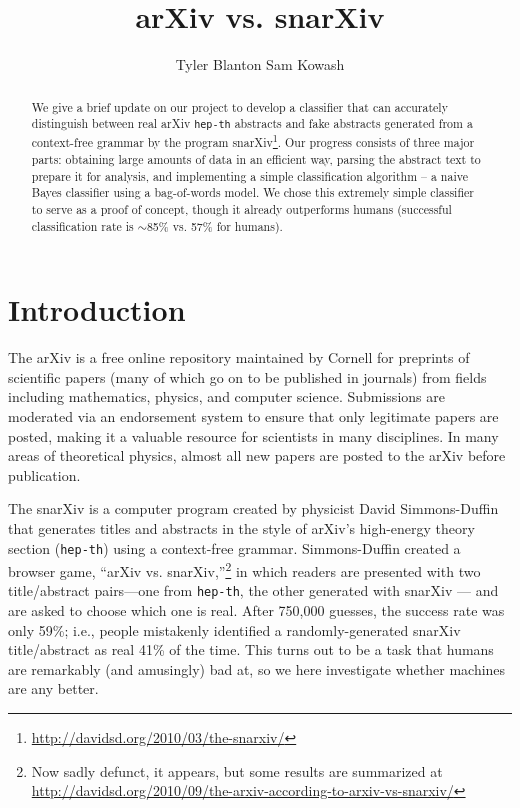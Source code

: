 \documentclass{article}
\title{arXiv vs. snarXiv}
\author{Tyler Blanton \And Sam Kowash}
\begin{document}

\maketitle

\begin{abstract}
  We give a brief update on our project to develop a classifier that can accurately distinguish between real arXiv \texttt{hep-th} abstracts and fake abstracts generated from a context-free grammar by the program snarXiv\footnote{\url{http://davidsd.org/2010/03/the-snarxiv/}}.
  Our progress consists of three major parts: obtaining large amounts of data in an efficient way, parsing the abstract text to prepare it for analysis, and implementing a simple classification algorithm -- a naive Bayes classifier using a bag-of-words model.
  We chose this extremely simple classifier to serve as a proof of concept, though it already outperforms humans (successful classification rate is $\sim$85\% vs. 57\% for humans).
\end{abstract}




\section{Introduction} \label{sec:intro}
The arXiv is a free online repository maintained by Cornell for preprints of scientific papers (many of which go on to be published in journals) from fields including mathematics, physics, and computer science.
Submissions are moderated via an endorsement system to ensure that only legitimate papers are posted, making it a valuable resource for scientists in many disciplines. In many areas of theoretical physics, almost all new papers are posted to the arXiv before publication.

The snarXiv is a computer program created by physicist David Simmons-Duffin that generates titles and abstracts in the style of arXiv's high-energy theory section (\texttt{hep-th}) using a context-free grammar.
Simmons-Duffin created a browser game, ``arXiv vs. snarXiv,''\footnote{Now sadly defunct, it appears, but some results are summarized at \url{http://davidsd.org/2010/09/the-arxiv-according-to-arxiv-vs-snarxiv/}} in which readers are presented with two title/abstract pairs---one from \texttt{hep-th}, the other generated with snarXiv --- and are asked to choose which one is real.
After 750,000 guesses, the success rate was only 59\%; i.e., people mistakenly identified a randomly-generated snarXiv title/abstract as real 41\% of the time.
This turns out to be a task that humans are remarkably (and amusingly) bad at, so we here investigate whether machines are any better.
\end{document}

